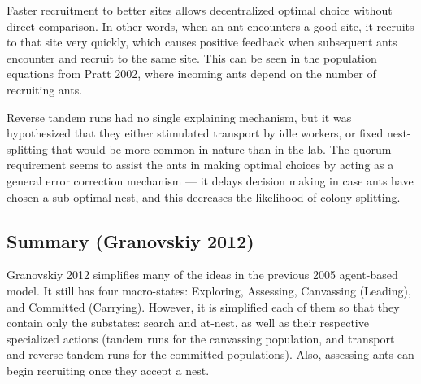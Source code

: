 \documentclass{article}
\makeatletter
\def\mcolor#1#{\@mcolor{#1}}
\def\@mcolor#1#2#3{%
  \protect\leavevmode
  \begingroup
    \color#1{#2}#3%
  \endgroup
}
\newcommand{\sitem}[1]
{
    \begin{itemize}
        \item #1
    \end{itemize}
}
\makeatother
\begin{document}
Faster recruitment to better sites allows decentralized optimal choice without direct comparison.
In other words, when an ant encounters a good site, it recruits to that site very quickly, which causes positive feedback when subsequent ants encounter and recruit to the same site.
This can be seen in the population equations from Pratt 2002, where incoming ants depend on the number of recruiting ants.


Reverse tandem runs had no single explaining mechanism, but it was hypothesized that they either stimulated transport by idle workers, or fixed nest-splitting that would be more common in nature than in the lab.
The quorum requirement seems to assist the ants in making optimal choices by acting as a general error correction mechanism --- it delays decision making in case ants have chosen a sub-optimal nest, and this decreases the likelihood of colony splitting.

\subsection{Summary (Granovskiy 2012)}

Granovskiy 2012 simplifies many of the ideas in the previous 2005 agent-based model.
It still has four macro-states: Exploring, Assessing, Canvassing (Leading), and Committed (Carrying).
However, it is simplified each of them so that they contain only the substates: search and at-nest, as well as their respective specialized actions (tandem runs for the canvassing population, and transport and reverse tandem runs for the committed populations). 
Also, assessing ants can begin recruiting once they accept a nest.
\end{document}
